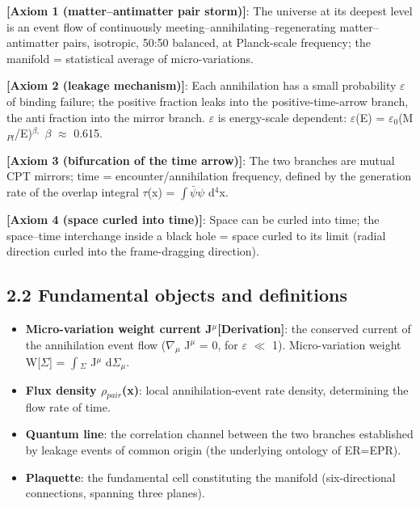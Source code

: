 \documentclass[12pt]{article}
\newcommand{\mtag}[1]{\textbf{[#1]}}
\newcommand{\up}[1]{\ensuremath{^{#1}}}
\newcommand{\down}[1]{\ensuremath{_{#1}}}
\begin{document}
\textbf{\mtag{Axiom 1 (matter--antimatter pair storm)}}: The universe at its deepest level is an event flow of continuously meeting--annihilating--regenerating matter--antimatter pairs, isotropic, 50:50 balanced, at Planck-scale frequency; the manifold = statistical average of micro-variations.

\textbf{\mtag{Axiom 2 (leakage mechanism)}}: Each annihilation has a small probability \ensuremath{\varepsilon} of binding failure; the positive fraction leaks into the positive-time-arrow branch, the anti fraction into the mirror branch. \ensuremath{\varepsilon} is energy-scale dependent: \ensuremath{\varepsilon}(E) = \ensuremath{\varepsilon}\down{0}(M\down{Pl}/E)\up{\beta{},} \ensuremath{\beta} \ensuremath{\approx} 0.615.

\textbf{\mtag{Axiom 3 (bifurcation of the time arrow)}}: The two branches are mutual CPT mirrors; time = encounter/annihilation frequency, defined by the generation rate of the overlap integral \ensuremath{\tau}(x) = \ensuremath{\int}\ensuremath{\bar{\psi}}\ensuremath{\psi} d\up{4}x.

\textbf{\mtag{Axiom 4 (space curled into time)}}: Space can be curled into time; the space--time interchange inside a black hole = space curled to its limit (radial direction curled into the frame-dragging direction).

\subsection{2.2 Fundamental objects and definitions}

\begin{itemize}
\item \textbf{Micro-variation weight current J\up{\mu{}}}\mtag{Derivation}: the conserved current of the annihilation event flow (\ensuremath{\nabla}\down{\mu{}} J\up{\mu{}} = 0, for \ensuremath{\varepsilon} \ensuremath{\ll} 1). Micro-variation weight W[\ensuremath{\Sigma}] = \ensuremath{\int}\down{\Sigma{}} J\up{\mu{}} d\ensuremath{\Sigma}\down{\mu{}}.
\item \textbf{Flux density \ensuremath{\rho}\down{pair}(x)}: local annihilation-event rate density, determining the flow rate of time.
\item \textbf{Quantum line}: the correlation channel between the two branches established by leakage events of common origin (the underlying ontology of ER=EPR).
\item \textbf{Plaquette}: the fundamental cell constituting the manifold (six-directional connections, spanning three planes).
\end{itemize}
\end{document}
